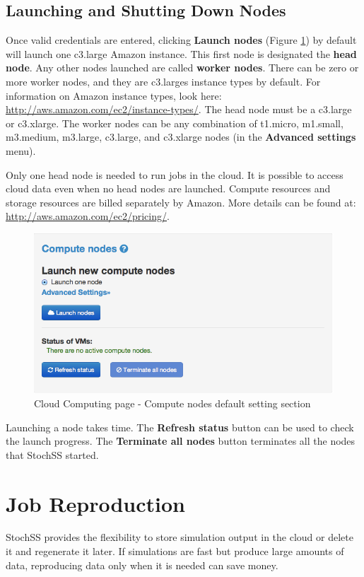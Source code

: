 \subsection{Launching and Shutting Down Nodes}
Once valid credentials are entered, clicking \textbf{Launch nodes} (Figure \ref{fig:2}) by default will launch one c3.large Amazon instance. This first node is designated the \textbf{head node}. Any other nodes launched are called \textbf{worker nodes}. There can be zero or more worker nodes, and they are c3.larges instance types by default. For information on Amazon instance types, look here: \url{http://aws.amazon.com/ec2/instance-types/}. The head node must be a c3.large or c3.xlarge. The worker nodes can be any combination of t1.micro, m1.small, m3.medium, m3.large, c3.large, and c3.xlarge nodes (in the \textbf{Advanced settings} menu).

Only one head node is needed to run jobs in the cloud. It is possible to access cloud data even when no head nodes are launched. Compute resources and storage resources are billed separately by Amazon. More details can be found at: \url{http://aws.amazon.com/ec2/pricing/}.

\begin{figure}[!ht]
\centering
\includegraphics[scale=0.45]{T6/T6_fig_computenode1.png}
\caption{Cloud Computing page - Compute nodes default setting section}
\label{fig:2}
\end{figure}

Launching a node takes time. The \textbf{Refresh status} button can be used to check the launch progress. The \textbf{Terminate all nodes} button terminates all the nodes that StochSS started.

\section{Job Reproduction}
StochSS provides the flexibility to store simulation output in the cloud or delete it and regenerate it later. If simulations are fast but produce large amounts of data, reproducing data only when it is needed can save money.

